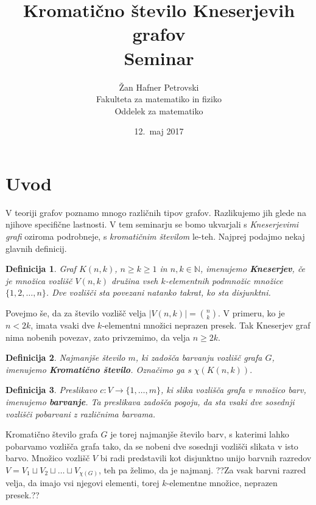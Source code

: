 \documentclass[a4paper,12pt]{article}
\title{Kromatično število Kneserjevih grafov \\ 
\Large Seminar}
\author{Žan Hafner Petrovski \\
Fakulteta za matematiko in fiziko \\
Oddelek za matematiko}
\date{12.\ maj 2017}
\newtheorem{definicija}{Definicija}
\begin{document}
 
\maketitle


\section{Uvod}

V teoriji grafov poznamo mnogo različnih tipov grafov. Razlikujemo jih glede na njihove specifične lastnosti. V tem seminarju se bomo ukvarjali s {\em Kneserjevimi grafi} oziroma podrobneje, s {\em kromatičnim številom} le-teh. Najprej podajmo nekaj glavnih definicij.


\begin{definicija}
Graf $K(n,k)$, $n \geq k \geq 1$ in $n, k \in \mathbb{N}$, imenujemo \mbox{\textbf{Kneserjev}}, če je množica vozlišč $V(n,k)$ družina vseh $k$-elementnih podmnožic množice $\{1, 2, \ldots, n\}$. Dve vozlišči sta povezani natanko takrat, ko sta disjunktni. 
\end{definicija}

Povejmo še, da za število vozlišč velja $|V(n,k)|={{n}\choose{k}}$. V primeru, ko je $n < 2k$, imata vsaki dve $k$-elementni množici neprazen presek. Tak Kneserjev graf nima nobenih povezav, zato privzemimo, da velja $n \geq 2k$.


\begin{definicija}
Najmanjše število $m$, ki zadošča barvanju vozlišč grafa $G$, imenujemo \textbf {Kromatično število}. Označimo ga s $\chi(K(n,k)).$
\end{definicija}

\begin{definicija}
Preslikavo $c: V \rightarrow \{1, \ldots, m\}$, ki slika vozlišča grafa v množico barv, imenujemo \textbf {barvanje}. Ta preslikava zadošča pogoju, da sta vsaki dve sosednji vozlišči pobarvani z različnima barvama.
\end{definicija}

Kromatično število grafa $G$ je torej najmanjše število barv, s katerimi lahko pobarvamo vozlišča grafa tako, da se nobeni dve sosednji vozlišči slikata v isto barvo. Množico vozlišč $V$ bi radi predstavili kot disjunktno unijo barvnih razredov $V = V_1 \sqcup V_2 \sqcup \ldots \sqcup V_{\chi(G)}$, teh pa želimo, da je najmanj. ??Za vsak barvni razred velja, da imajo vsi njegovi elementi, torej $k$-elementne množice, neprazen presek.??
\end{document}
